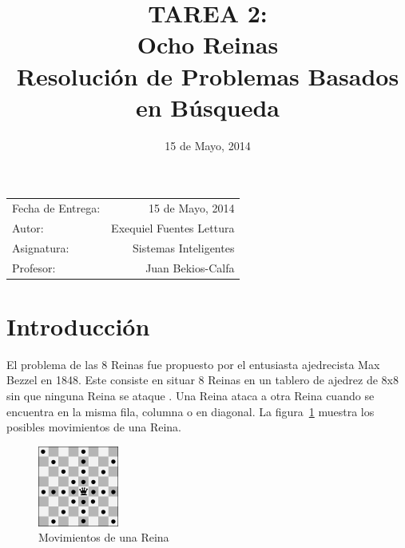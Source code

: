 \documentclass[letter, 10pt]{article}
\title{TAREA 2: \\ Ocho Reinas \\ Resolución de Problemas Basados en Búsqueda} %
\date{15 de Mayo, 2014}
\begin{document}
\maketitle %
\thispagestyle{fancy}

\begin{center}
\begin{tabular}{l r}
Fecha de Entrega: &  15 de Mayo, 2014 \\ %
Autor: & Exequiel Fuentes Lettura \\
Asignatura: & Sistemas Inteligentes\\ %
Profesor: & Juan Bekios-Calfa %
\end{tabular}
\end{center}



\section{Introducción}

El problema de las 8 Reinas fue propuesto por el entusiasta ajedrecista Max Bezzel en 1848. Este consiste en situar 8 Reinas en un tablero de ajedrez de 8x8 sin que ninguna Reina se ataque \cite[pág 71]{Russell10}. Una Reina ataca a otra Reina cuando se encuentra en la misma fila, columna o en diagonal. La figura~\ref{fig:mov_queen} muestra los posibles movimientos de una Reina.

\begin{figure}[H]
    \begin{center}
        \includegraphics[width=100px,height=100px,keepaspectratio]{images/reinamueve}
        \caption{Movimientos de una Reina}
        \label{fig:mov_queen}
    \end{center}
\end{figure}
\end{document}
